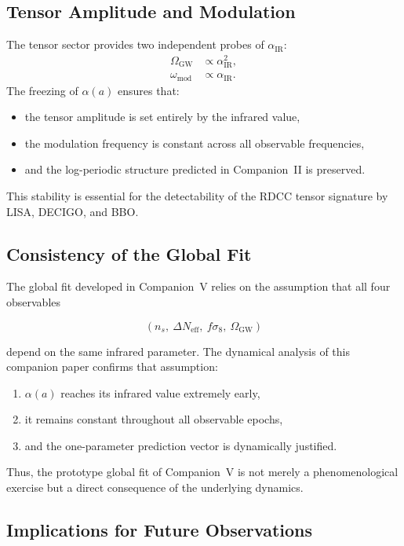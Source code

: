 \documentclass[11pt,a4paper]{article}
\begin{document}
\subsection{Tensor Amplitude and Modulation}

The tensor sector provides two independent probes of $\alpha_{\mathrm{IR}}$:
\begin{align}
    \Omega_{\mathrm{GW}} &\propto \alpha_{\mathrm{IR}}^2, \\
    \omega_{\mathrm{mod}} &\propto \alpha_{\mathrm{IR}}.
\end{align}
The freezing of $\alpha(a)$ ensures that:
\begin{itemize}
    \item the tensor amplitude is set entirely by the infrared value,
    \item the modulation frequency is constant across all observable frequencies,
    \item and the log-periodic structure predicted in Companion~II is preserved.
\end{itemize}
This stability is essential for the detectability of the RDCC tensor signature by LISA, DECIGO,
and BBO.

\subsection{Consistency of the Global Fit}

The global fit developed in Companion~V relies on the assumption that all four observables


\[
    (n_s,\ \Delta N_{\mathrm{eff}},\ f\sigma_8,\ \Omega_{\mathrm{GW}})
\]


depend on the same infrared parameter. The dynamical analysis of this companion paper
confirms that assumption:
\begin{enumerate}
    \item $\alpha(a)$ reaches its infrared value extremely early,
    \item it remains constant throughout all observable epochs,
    \item and the one-parameter prediction vector is dynamically justified.
\end{enumerate}
Thus, the prototype global fit of Companion~V is not merely a phenomenological exercise but a
direct consequence of the underlying dynamics.

\subsection{Implications for Future Observations}
\end{document}
